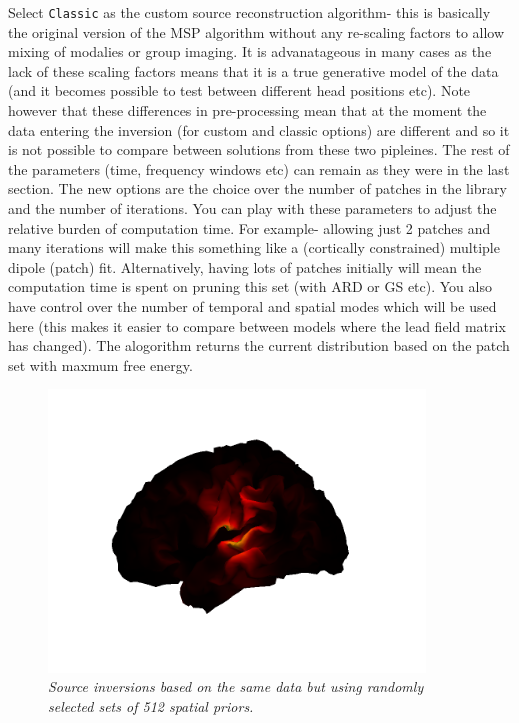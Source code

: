 Select \texttt{Classic} as the custom source reconstruction algorithm- this is basically the original version of the MSP algorithm without any re-scaling factors to allow mixing of modalies or group imaging. It is advanatageous in many cases as the lack of these scaling factors means that it is a true generative model of the data (and it becomes possible to test between different head positions etc). Note however that these differences in pre-processing mean that at the moment the data entering the inversion (for custom and classic options) are different and so it is not possible to compare between solutions from these two pipleines.
 The rest of the parameters (time, frequency windows etc) can remain as they were in the last section. The new options are the choice over the number of patches in the library  and the number of iterations. You can play with these parameters to adjust the relative burden of computation time. For example- allowing just 2 patches and many iterations will make this something like a (cortically constrained) multiple dipole (patch) fit. Alternatively, having lots of patches initially will mean the computation time is spent on pruning this set (with ARD or GS etc). 
You also have control over the number of temporal and spatial modes which will be used here (this makes it easier to compare between models where the lead field matrix has changed). 
The alogorithm returns the current distribution based on the patch set with maxmum free energy.

\begin{figure}
\begin{center}
\includegraphics[width=100mm]{meg_sloc/slide7}
\caption{\em  Source inversions based on the same data but using randomly selected sets of 512 spatial priors.\label{meg_sloc:fig:7}}
\end{center}
\end{figure}


